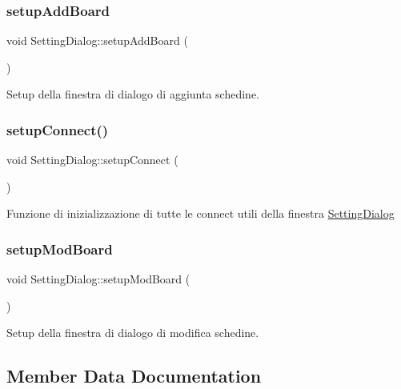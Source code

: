 \subsubsection{\texorpdfstring{setup\+Add\+Board}{setupAddBoard}}
{\footnotesize\ttfamily void Setting\+Dialog\+::setup\+Add\+Board (\begin{DoxyParamCaption}{ }\end{DoxyParamCaption})\hspace{0.3cm}{\ttfamily [slot]}}

Setup della finestra di dialogo di aggiunta schedine. \mbox{\label{class_setting_dialog_ab65b6073c77660f4b30c51132c90e320}} 
\subsubsection{\texorpdfstring{setup\+Connect()}{setupConnect()}}
{\footnotesize\ttfamily void Setting\+Dialog\+::setup\+Connect (\begin{DoxyParamCaption}{ }\end{DoxyParamCaption})}

Funzione di inizializzazione di tutte le connect utili della finestra \hyperlink{class_setting_dialog}{Setting\+Dialog} \mbox{\label{class_setting_dialog_a9a40a643ecd914be543876fe61c4518a}} 
\subsubsection{\texorpdfstring{setup\+Mod\+Board}{setupModBoard}}
{\footnotesize\ttfamily void Setting\+Dialog\+::setup\+Mod\+Board (\begin{DoxyParamCaption}{ }\end{DoxyParamCaption})\hspace{0.3cm}{\ttfamily [slot]}}

Setup della finestra di dialogo di modifica schedine. 

\subsection{Member Data Documentation}
\mbox{\label{class_setting_dialog_a4d8761a715292f8900d96b17d26814ad}} 
